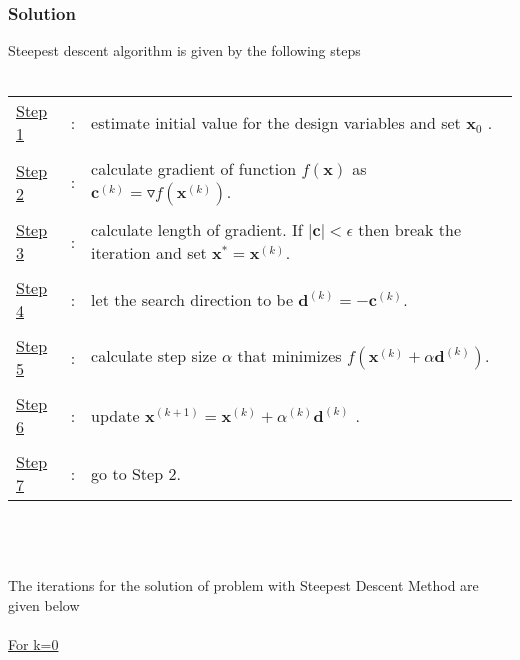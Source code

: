 \documentclass[]{report}
\begin{document}
\subsubsection*{Solution}
Steepest descent algorithm is given by the following steps\\
~\\
\begin{tabular}{lll}
\underline{Step 1} &:& estimate initial value for the design variables and set $\mathbf x_0$ .\\ 
&&\\
 \underline{Step 2} &:& calculate gradient of function $f\left(\mathbf x\right)$ as $\mathbf c^{(k)}=\triangledown f\left(\mathbf x^{(k)}\right)$.\\ 
 &&\\
 \underline{Step 3} &:& calculate length of gradient. If $\lvert \mathbf c\rvert<\epsilon$ then break the iteration and set $\mathbf x^*=\mathbf x^{(k)}$. \\ 
 &&\\
 \underline{Step 4} &:& let the search direction to be $\mathbf d^{(k)}=-\mathbf c^{(k)}$. \\ 
 &&\\
 \underline{Step 5} &:& calculate step size $\alpha$ that minimizes $f\left(\mathbf x^{(k)}+\alpha\mathbf d^{(k)}\right)$. \\ 
 &&\\
 \underline{Step 6} &:& update $\mathbf x^{(k+1)}=\mathbf x^{(k)}+\alpha^{(k)}\mathbf d^{(k)}$ .\\
  &&\\
\underline{Step 7} &:& go to Step 2.
\end{tabular} 
\\
~
\\
~
\\
The iterations for the solution of problem with Steepest Descent Method are given below
\\
~
\\
\underline{For k=0}
\end{document}
